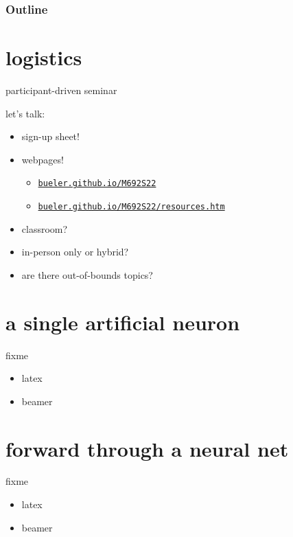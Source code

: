 \documentclass[xcolor={svgnames},
               hyperref={colorlinks,citecolor=DeepPink4,linkcolor=FireBrick,urlcolor=Maroon}]
               {beamer}
\begin{document}
\begin{frame}
  \frametitle{Outline}
  \tableofcontents[hideallsubsections]
\end{frame}

\section{logistics}

\begin{frame}{participant-driven seminar}

let's talk:
\begin{itemize}
\item sign-up sheet!
\item webpages!
    \begin{itemize}
    \item \href{http://bueler.github.io/M692S22/index.html}{\texttt{bueler.github.io/M692S22}}
    \item \href{http://bueler.github.io/M692S22/resources.htm}{\texttt{bueler.github.io/M692S22/resources.htm}}
    \end{itemize}
\item classroom?
\item in-person only or hybrid?
\item are there out-of-bounds topics?
\end{itemize}
\end{frame}

\section{a single artificial neuron}

\begin{frame}{fixme}

\begin{itemize}
\item latex
\item beamer
\end{itemize}
\end{frame}

\section{forward through a neural net}

\begin{frame}{fixme}

\begin{itemize}
\item latex
\item beamer
\end{itemize}
\end{frame}
\end{document}
